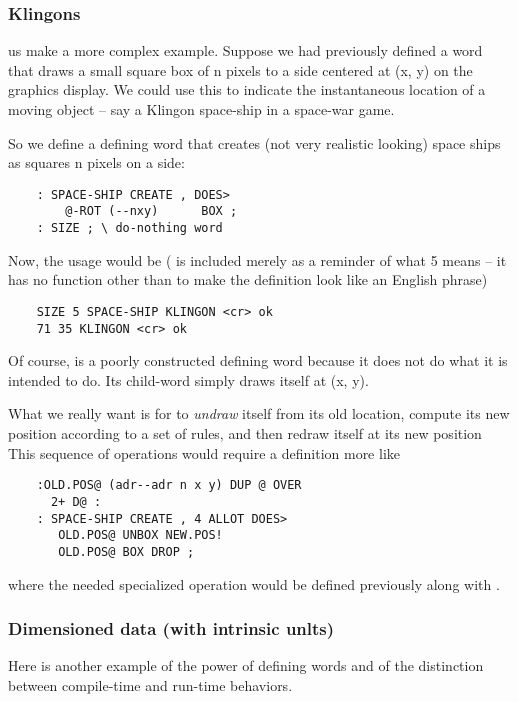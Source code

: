 \subsubsection{Klingons}

 us make a more complex example. Suppose we had previously defined a word  that draws a small square box of n pixels to a side centered at (x, y) on the graphics display. We could use this to indicate the instantaneous location of a moving object -- say a Klingon space-ship in a space-war game.

So we define a defining word that creates (not very realistic looking) space ships as squares n pixels on a side:

\begin{lstlisting}
    : SPACE-SHIP CREATE , DOES>
        @-ROT (--nxy)      BOX ;
    : SIZE ; \ do-nothing word
\end{lstlisting}

Now, the usage would be ( is included merely as a reminder of what 5 means -- it has no function other than to make the definition look like an English phrase)

\begin{lstlisting}
    SIZE 5 SPACE-SHIP KLINGON <cr> ok
    71 35 KLINGON <cr> ok
\end{lstlisting}

Of course,  is a poorly constructed defining word because it does not do what it is intended to do. Its child-word  simply draws itself at (x, y).

What we really want is for  to \textit{undraw} itself from its old location, compute its new position according to a set of rules, and then redraw itself at its new position This sequence of operations would require a definition more like

\begin{lstlisting}
    :OLD.POS@ (adr--adr n x y) DUP @ OVER
      2+ D@ :
    : SPACE-SHIP CREATE , 4 ALLOT DOES>
       OLD.POS@ UNBOX NEW.POS!
       OLD.POS@ BOX DROP ;
\end{lstlisting}

where the needed specialized operation  would be defined previously along with .

\subsubsection{Dimensioned data (with intrinsic unlts)}
Here is another example of the power of defining words and of the distinction between compile-time and run-time behaviors.

